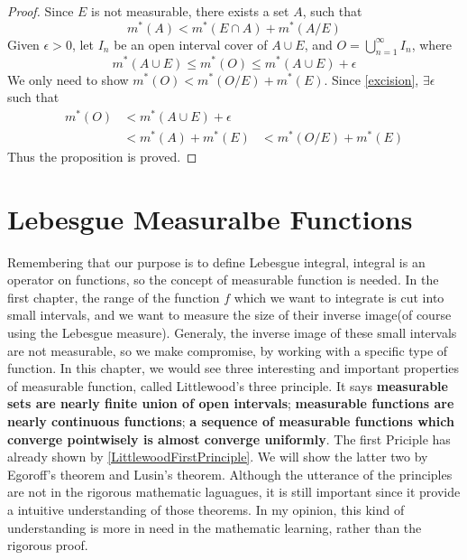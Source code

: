 \documentclass[lang=en, 12pt]{elegantbook}
\begin{document}
            \begin{proof}
                Since $E$ is not measurable, there exists a set $A$, such that 
                \begin{equation}\label{excision}
                    m^*(A) < m^*(E \cap A) + m^*(A / E)
                \end{equation}
                Given $\epsilon > 0$, let $I_n$ be an open interval cover of $A \cup E$, and $O = \bigcup_{n=1}^{\infty} I_n$, where
            $$m^*(A \cup E) \leq m^*(O) \leq m^*(A \cup E) + \epsilon$$ 
                We only need to show $m^*(O)<m^*(O/E) + m^*(E)$. Since \eqref{excision}, $\exists \epsilon$ such that  
                \begin{equation*}
                    \begin{aligned}
                        m^*(O) &< m^*(A \cup E) + \epsilon \\
                        &< m^*(A) + m^*(E)
                        &< m^*(O/E) + m^*(E)
                    \end{aligned}
                \end{equation*}
                Thus the proposition is proved.
            \end{proof}

    \chapter{Lebesgue Measuralbe Functions}
            Remembering that our purpose is to define Lebesgue integral, integral is an operator on functions, so the concept of measurable function
        is needed. In the first chapter, the range of the function $f$ which we want to integrate is cut into small intervals, and we want to 
        measure the size of their inverse image(of course using the Lebesgue measure). Generaly, the inverse image of these small intervals are not
        measurable, so we make compromise, by working with a specific type of function. 
            In this chapter, we would see three interesting and important properties of measurable function, called Littlewood's three principle. It
        says \textbf{measurable sets are nearly finite union of open intervals}; \textbf{measurable functions are nearly continuous functions};
        \textbf{a sequence of measurable functions which converge pointwisely is almost converge uniformly}. The first Priciple has already 
        shown by \eqref{LittlewoodFirstPrinciple}. We will show the latter two by Egoroff's theorem and Lusin's theorem. Although the 
        utterance of the principles are not in the rigorous mathematic laguagues, it is still important since it provide a intuitive 
        understanding of those theorems. In my opinion, this kind of understanding is more in need in the mathematic learning, rather than
        the rigorous proof.
\end{document}
